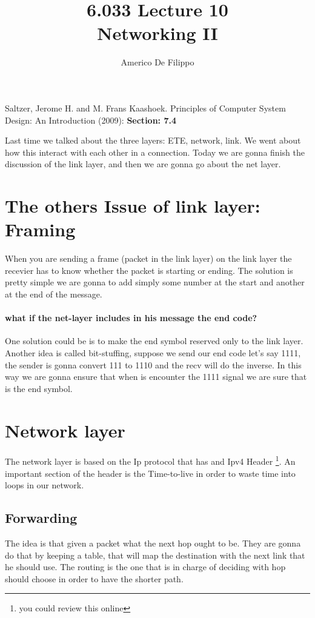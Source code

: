 \documentclass{article}
\title{6.033 Lecture 10 \\ Networking II}
\author{Americo De Filippo}
\begin{document}
 
  \maketitle
  \begin{thebibliography}{9}
    Saltzer, Jerome H. and M. Frans Kaashoek. Principles of Computer System Design: An Introduction (2009): \textbf{Section: 7.4}
  \end{thebibliography}
  Last time we talked about the three layers: ETE, network, link. We went about how this
  interact with each other in a connection. Today we are gonna finish the discussion of 
  the link layer, and then we are gonna go about the net layer.
  \section{The others Issue of link layer: Framing}
    When you are sending a frame (packet in the link layer) on the link layer the recevier
    has to know whether the packet is starting or ending. The solution is pretty simple 
    we are gonna to add simply some number at the start and another at the end of the 
    message. 
    \paragraph{what if the net-layer includes in his message the end code?} One solution
      could be is to make the end symbol reserved only to the link layer. Another idea is 
      called bit-stuffing, suppose we send our end code let's say 1111, the sender is gonna
      convert 111 to 1110 and the recv will do the inverse. In this way we are gonna
      ensure that when is encounter the 1111 signal we are sure that is the end symbol. 
  \section{Network layer}
    The network layer is based on the Ip protocol that has and Ipv4 Header \footnote{you could
    review this online}. An important section of the header is the Time-to-live in order to 
    waste time into loops in our network.
    \subsection{Forwarding}
      The idea is that given a packet what the next hop ought to be. They are gonna do that
      by keeping a table, that will map the destination with the next link that he should use.
      The routing is the one that is in charge of deciding with hop should choose in order to
      have the shorter path. 
\end{document}
